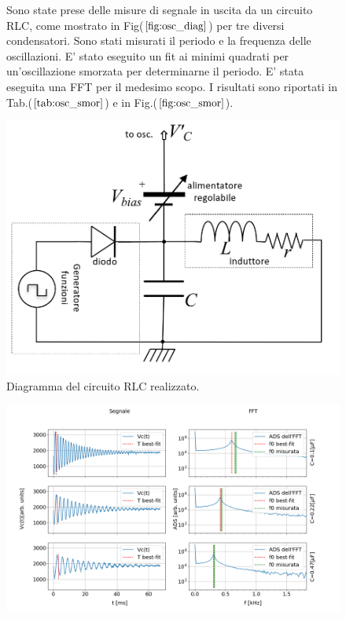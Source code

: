 \documentclass{article}
\begin{document}
        
        \begin{figure}[H]
            \begin{minipage}{0.45\textwidth}
                Sono state prese delle misure di segnale in uscita da un circuito RLC,
                come mostrato in Fig($\ref{fig:osc_diag}$) per tre diversi condensatori.
                Sono stati misurati il periodo e la frequenza delle oscillazioni.
                E' stato eseguito un fit ai minimi quadrati per un'oscillazione 
                smorzata per determinarne il periodo.
                E' stata eseguita una FFT per il medesimo scopo.
                I risultati sono riportati in Tab.($\ref{tab:osc_smor}$) e 
                in Fig.($\ref{fig:osc_smor}$).
            \end{minipage}%
            \hfill
            \begin{minipage}{0.45\textwidth}
                \includegraphics[width=\textwidth]{FFT12/RLCdiagram.png}
                \caption{Diagramma del circuito RLC realizzato.}
                \label{fig:osc_diag}
            \end{minipage}
        \end{figure}

        \begin{figure}[H]
            \centering
            \includegraphics[width=\textwidth]{FFT12/FFTRLC.png}
            \caption{}
            \label{fig:osc_smor}
        \end{figure}
\end{document}
